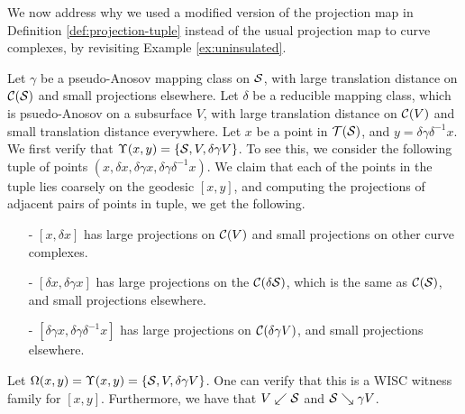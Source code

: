 \documentclass[12pt, reqno]{amsart}
\begin{document}
We now address why we used a modified version of the projection map in Definition \ref{def:projection-tuple} instead of the usual projection map to curve complexes, by revisiting Example \ref{ex:uninsulated}.
\begin{example}
  \label{ex:need-for-modified-projection}
  Let $\gamma$ be a pseudo-Anosov mapping class on $\mathcal{S}$, with large translation distance on $\mathcal{C}(\mathcal{S})$ and small projections elsewhere.
  Let $\delta$ be a reducible mapping class, which is psuedo-Anosov on a subsurface $V$, with large translation distance on $\mathcal{C}(V)$ and small translation distance everywhere.
  Let $x$ be a point in $\mathcal{T}(\mathcal{S})$, and $y = \delta \gamma \delta^{-1} x$.
  We first verify that $\Upsilon(x,y) = \left\{ \mathcal{S}, V, \delta \gamma V \right\}$.
  To see this, we consider the following tuple of points $(x, \delta x, \delta \gamma x, \delta \gamma \delta^{-1}x)$.
  We claim that each of the points in the tuple lies coarsely on the geodesic $[x,y]$, and computing the projections of adjacent pairs of points in tuple, we get the following.
  \begin{itemize}
  \item[-] $[x, \delta x]$ has large projections on $\mathcal{C}(V)$ and small projections on other curve complexes.
  \item[-] $[\delta x, \delta \gamma x]$ has large projections on the $\mathcal{C}(\delta \mathcal{S})$, which is the same as $\mathcal{C}(\mathcal{S})$, and small projections elsewhere.
  \item[-] $[\delta \gamma x, \delta \gamma \delta^{-1} x]$ has large projections on $\mathcal{C}(\delta \gamma V)$, and small projections elsewhere.
  \end{itemize}
  Let $\Omega(x, y) = \Upsilon(x,y) = \left\{ \mathcal{S}, V, \delta \gamma V \right\}$.
  One can verify that this is a WISC witness family for $[x,y]$.
  Furthermore, we have that $V \swarrow \mathcal{S}$ and $\mathcal{S} \searrow \gamma V$.


\end{example}
\end{document}
